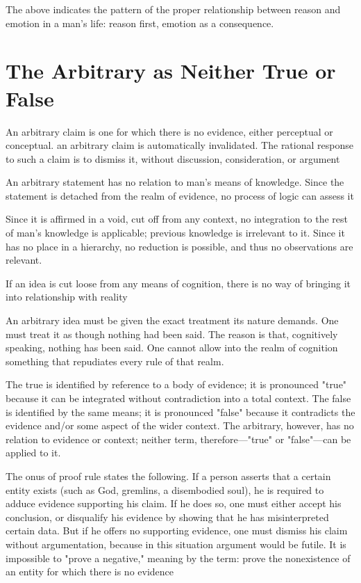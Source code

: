         The above indicates the pattern of the proper relationship between reason and emotion in a man's life: reason first, emotion as a consequence.

    \section{The Arbitrary as Neither True or False}
    
        An arbitrary claim is one for which there is no evidence, either perceptual or conceptual. an arbitrary claim is automatically invalidated. The rational response to such a claim is to dismiss it, without discussion, consideration, or argument
        
        An arbitrary statement has no relation to man's means of knowledge. Since the statement is detached from the realm of evidence, no process of logic can assess it
        
        Since it is affirmed in a void, cut off from any context, no integration to the rest of man's knowledge is applicable; previous knowledge is irrelevant to it. Since it has no place in a hierarchy, no reduction is possible, and thus no observations are relevant.
        
        If an idea is cut loose from any means of cognition, there is no way of bringing it into relationship with reality
        
        An arbitrary idea must be given the exact treatment its nature demands. One must treat it as though nothing had been said. The reason is that, cognitively speaking, nothing has been said. One cannot allow into the realm of cognition something that repudiates every rule of that realm.
        
        The true is identified by reference to a body of evidence; it is pronounced "true" because it can be integrated without contradiction into a total context. The false is identified by the same means; it is pronounced "false" because it contradicts the evidence and/or some aspect of the wider context. The arbitrary, however, has no relation to evidence or context; neither term, therefore—"true" or "false"—can be applied to it.
        
        The onus of proof rule states the following. If a person asserts that a certain entity exists (such as God, gremlins, a disembodied soul), he is required to adduce evidence supporting his claim. If he does so, one must either accept his conclusion, or disqualify his evidence by showing that he has misinterpreted certain data. But if he offers no supporting evidence, one must dismiss his claim without argumentation, because in this situation argument would be futile. It is impossible to "prove a negative," meaning by the term: prove the nonexistence of an entity for which there is no evidence
        
